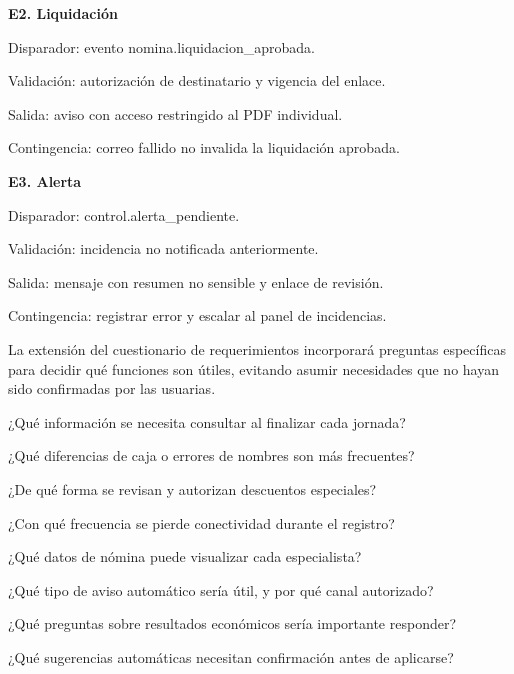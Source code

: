 \textbf{E2. Liquidación}


\begin{vinetas}
\item Disparador: evento nomina.liquidacion\_aprobada.
\item Validación: autorización de destinatario y vigencia del enlace.
\item Salida: aviso con acceso restringido al PDF individual.
\item Contingencia: correo fallido no invalida la liquidación aprobada.
\end{vinetas}

\textbf{E3. Alerta}


\begin{vinetas}
\item Disparador: control.alerta\_pendiente.
\item Validación: incidencia no notificada anteriormente.
\item Salida: mensaje con resumen no sensible y enlace de revisión.
\item Contingencia: registrar error y escalar al panel de incidencias.
\end{vinetas}


La extensión del cuestionario de requerimientos incorporará preguntas específicas para decidir qué funciones son útiles, evitando asumir necesidades que no hayan sido confirmadas por las usuarias.


\begin{vinetas}
\item ¿Qué información se necesita consultar al finalizar cada jornada?
\item ¿Qué diferencias de caja o errores de nombres son más frecuentes?
\item ¿De qué forma se revisan y autorizan descuentos especiales?
\item ¿Con qué frecuencia se pierde conectividad durante el registro?
\item ¿Qué datos de nómina puede visualizar cada especialista?
\item ¿Qué tipo de aviso automático sería útil, y por qué canal autorizado?
\item ¿Qué preguntas sobre resultados económicos sería importante responder?
\item ¿Qué sugerencias automáticas necesitan confirmación antes de aplicarse?
\end{vinetas}


